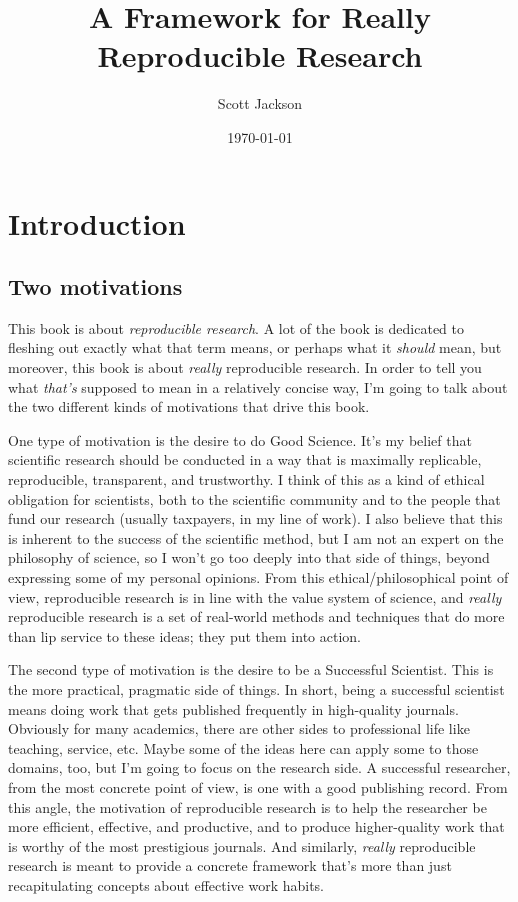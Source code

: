 \documentclass{book}
\title{A Framework for Really Reproducible Research}
\author{Scott Jackson}
\date{\today}
\begin{document}
\maketitle

\setcounter{tocdepth}{3}
\tableofcontents
\vspace*{1cm}

\chapter{Introduction}
\label{sec-1}
\label{intro}
\section{Two motivations}
\label{sec-1-1}

This book is about \emph{reproducible research}. A lot of the book is dedicated to fleshing out exactly what that term means, or perhaps what it \emph{should} mean, but moreover, this book is about \emph{really} reproducible research.  In order to tell you what \emph{that's} supposed to mean in a relatively concise way, I'm going to talk about the two different kinds of motivations that drive this book.

One type of motivation is the desire to do Good Science.  It's my belief that scientific research should be conducted in a way that is maximally replicable, reproducible, transparent, and trustworthy.  I think of this as a kind of ethical obligation for scientists, both to the scientific community and to the people that fund our research (usually taxpayers, in my line of work).  I also believe that this is inherent to the success of the scientific method, but I am not an expert on the philosophy of science, so I won't go too deeply into that side of things, beyond expressing some of my personal opinions.  From this ethical/philosophical point of view, reproducible research is in line with the value system of science, and \emph{really} reproducible research is a set of real-world methods and techniques that do more than lip service to these ideas; they put them into action.

The second type of motivation is the desire to be a Successful Scientist.  This is the more practical, pragmatic side of things. In short, being a successful scientist means doing work that gets published frequently in high-quality journals.  Obviously for many academics, there are other sides to professional life like teaching, service, etc.  Maybe some of the ideas here can apply some to those domains, too, but I'm going to focus on the research side. A successful researcher, from the most concrete point of view, is one with a good publishing record.  From this angle, the motivation of reproducible research is to help the researcher be more efficient, effective, and productive, and to produce higher-quality work that is worthy of the most prestigious journals. And similarly, \emph{really} reproducible research is meant to provide a concrete framework that's more than just recapitulating concepts about effective work habits.
\end{document}
